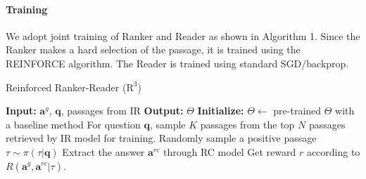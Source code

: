 \documentclass[letterpaper]{article} %
\begin{document}
\paragraph{Training}

We adopt joint training of Ranker and Reader as shown in Algorithm 1.  Since the Ranker makes a hard selection of the passage, it is trained using the REINFORCE algorithm. The Reader is trained using standard
SGD/backprop.


\begin{algorithm}
	\label{algorithm:alg1}
    \caption{Reinforced Ranker-Reader ($\text{R}^{3}$)}
  \begin{algorithmic}[1]
    \State \textbf{Input: }$\mathbf{a}^{g}$, $\mathbf{q}$, passages from IR
    \State \textbf{Output:} $\Theta$ 
    \State \textbf{Initialize:}
     $\Theta \gets$ pre-trained $\Theta$ with a baseline method\footnotemark
      \STATE For question $\mathbf{q}$, sample $K$ passages from the top $N$ passages retrieved by IR model for training. \footnotemark
      \STATE Randomly sample a positive passage $\tau \sim \pi (\tau | \mathbf{q})$
      \STATE Extract the answer $\mathbf{a}^{rc}$ through RC model
      \STATE Get reward $r$ according to $R(\mathbf{a}^g,\mathbf{a}^{rc}|\tau)$.
	\ENDFOR
  \end{algorithmic}
\end{algorithm}
 \addtocounter{footnote}{-2} %
\end{document}
